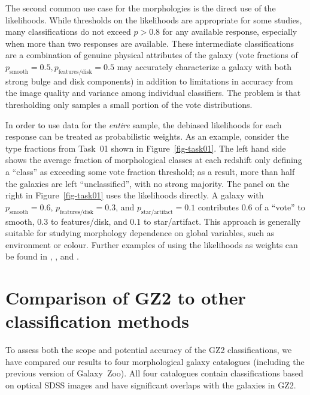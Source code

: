\documentclass[useAMS,usenatbib]{mn2e}
\begin{document}
The second common use case for the morphologies is the direct use of the likelihoods. While thresholds on the likelihoods are appropriate for some studies, many classifications do not exceed $p>0.8$ for any available response, especially when more than two responses are available. These intermediate classifications are a combination of genuine physical attributes of the galaxy (vote fractions of $p_\mathrm{smooth}=0.5,p_\mathrm{features/disk}=0.5$ may accurately characterize a galaxy with both strong bulge and disk components) in addition to limitations in accuracy from the image quality and variance among individual classifiers. The problem is that thresholding only samples a small portion of the vote distributions.

In order to use data for the {\it entire} sample, the debiased likelihoods for each response can be treated as probabilistic weights. As an example, consider the type fractions from Task~01 shown in Figure~\ref{fig-task01}. The left hand side shows the average fraction of morphological classes at each redshift only defining a ``class'' as exceeding some vote fraction threshold; as a result, more than half the galaxies are left ``unclassified'', with no strong majority. The panel on the right in Figure~\ref{fig-task01} uses the likelihoods directly. A galaxy with $p_\mathrm{smooth}=0.6$, $p_\mathrm{features/disk}=0.3$, and $p_\mathrm{star/artifact}=0.1$ contributes $0.6$ of a ``vote'' to smooth, $0.3$ to features/disk, and $0.1$ to star/artifact. This approach is generally suitable for studying morphology dependence on global variables, such as environment or colour. Further examples of using the likelihoods as weights can be found in \citet{bam09}, \citet{ski12}, and \citet{cas13}.


\section{Comparison of GZ2 to other classification methods}\label{sec-comparison}

To assess both the scope and potential accuracy of the GZ2 classifications, we have compared our results to four morphological galaxy catalogues (including the previous version of Galaxy~Zoo). All four catalogues contain classifications based on optical SDSS images and have significant overlaps with the galaxies in GZ2. 
\end{document}
